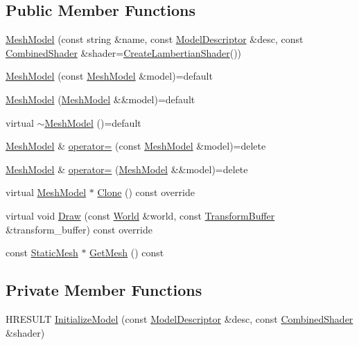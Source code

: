 \subsection*{Public Member Functions}
\begin{DoxyCompactItemize}
\item 
\hyperlink{classmage_1_1_mesh_model_ab340d6b0791d737e6f632422390f0ae1}{Mesh\+Model} (const string \&name, const \hyperlink{classmage_1_1_model_descriptor}{Model\+Descriptor} \&desc, const \hyperlink{structmage_1_1_combined_shader}{Combined\+Shader} \&shader=\hyperlink{namespacemage_ab0bd21012fa29244f0f9b3201bebc2a5}{Create\+Lambertian\+Shader}())
\item 
\hyperlink{classmage_1_1_mesh_model_a60bdd36ff7a0713f82b60287d9a8568c}{Mesh\+Model} (const \hyperlink{classmage_1_1_mesh_model}{Mesh\+Model} \&model)=default
\item 
\hyperlink{classmage_1_1_mesh_model_af7e00b17aa7c20bd575cf276c3d1e32e}{Mesh\+Model} (\hyperlink{classmage_1_1_mesh_model}{Mesh\+Model} \&\&model)=default
\item 
virtual \hyperlink{classmage_1_1_mesh_model_a5e918737b966842a31381ef6c00ca6d2}{$\sim$\+Mesh\+Model} ()=default
\item 
\hyperlink{classmage_1_1_mesh_model}{Mesh\+Model} \& \hyperlink{classmage_1_1_mesh_model_a0cffe92f76d2470c67ae71a5a4046259}{operator=} (const \hyperlink{classmage_1_1_mesh_model}{Mesh\+Model} \&model)=delete
\item 
\hyperlink{classmage_1_1_mesh_model}{Mesh\+Model} \& \hyperlink{classmage_1_1_mesh_model_ab01cee26691745ec7cd1af933bb5fa99}{operator=} (\hyperlink{classmage_1_1_mesh_model}{Mesh\+Model} \&\&model)=delete
\item 
virtual \hyperlink{classmage_1_1_mesh_model}{Mesh\+Model} $\ast$ \hyperlink{classmage_1_1_mesh_model_a7130eca9a1dac038c33b838c15138161}{Clone} () const override
\item 
virtual void \hyperlink{classmage_1_1_mesh_model_a80ef930e0ce901293106ce4ea1336e26}{Draw} (const \hyperlink{classmage_1_1_world}{World} \&world, const \hyperlink{structmage_1_1_transform_buffer}{Transform\+Buffer} \&transform\+\_\+buffer) const override
\item 
const \hyperlink{classmage_1_1_static_mesh}{Static\+Mesh} $\ast$ \hyperlink{classmage_1_1_mesh_model_a16adbbbab2041bfe0b15d3fb108d57cf}{Get\+Mesh} () const
\end{DoxyCompactItemize}
\subsection*{Private Member Functions}
\begin{DoxyCompactItemize}
\item 
H\+R\+E\+S\+U\+LT \hyperlink{classmage_1_1_mesh_model_a9971552f5c866b8ed221df056c46a42d}{Initialize\+Model} (const \hyperlink{classmage_1_1_model_descriptor}{Model\+Descriptor} \&desc, const \hyperlink{structmage_1_1_combined_shader}{Combined\+Shader} \&shader)
\end{DoxyCompactItemize}
